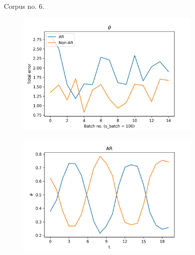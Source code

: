 \documentclass[12pt]{article}
\begin{document}
\begin{figure}[H]
\begin{subfigure}[b]{0.3\textwidth}
  \end{subfigure}%
  \caption{Corpus no. $6$.}

\end{figure}

\begin{figure}[H]
  \centering
  \begin{subfigure}[b]{0.3\textwidth}
    \includegraphics[width=\linewidth]{performance_thetas_experiment-1|overlapping-yes_dataset-7.png}
  \end{subfigure}%
  \begin{subfigure}[b]{0.3\textwidth}
    \includegraphics[width=\linewidth]{latent_thetas_AR_experiment-1|overlapping-yes_dataset-7.png}
  \end{subfigure}%
  \begin{subfigure}[b]{0.3\textwidth}

\end{subfigure}
\end{figure}
\end{document}
